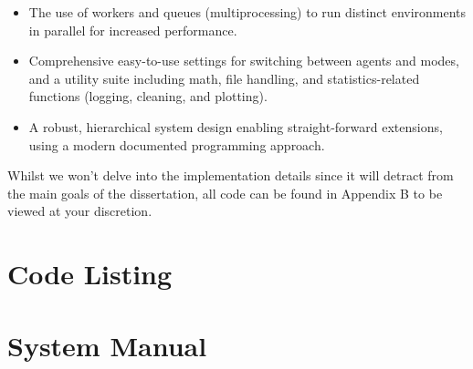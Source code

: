 \documentclass[a4paper]{report}
\begin{document}
\begin{itemize}
  \item The use of workers and queues (multiprocessing) to run distinct environments in parallel for increased performance.
  \item Comprehensive easy-to-use settings for switching between agents and modes, and a utility suite including math, file handling, and statistics-related functions (logging, cleaning, and plotting).
  \item A robust, hierarchical system design enabling straight-forward extensions, using a modern documented programming approach.
\end{itemize}

Whilst we won't delve into the implementation details since it will detract from the main goals of the dissertation, all code can be found in Appendix B to be viewed at your discretion.

\chapter{Code Listing}

\chapter{System Manual}
\end{document}
